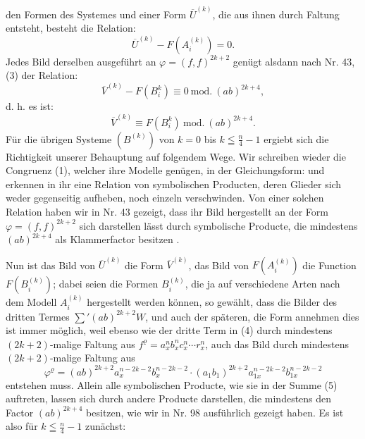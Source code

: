 den Formen des Systemes und einer Form $\overline{U}^{(k)}$, die aus ihnen durch
Faltung entsteht, besteht die Relation:
\[
\overline{U}^{(k)} - F(A_i^{(k)}) = 0.
\]
Jedes Bild derselben ausgeführt an $\varphi = (f,f)^{2k+2}$ genügt alsdann
nach Nr. 43, (3) der Relation:
\[
\overline{V}^{(k)} - F(B_i^{k}) \equiv 0 \ \mathrm{mod.}\ (ab)^{2k+4},
\]
d. h. es ist:
\[
\overline{V}^{(k)} \equiv F(B_i^{k}) \ \mathrm{mod.}\ (ab)^{2k+4}.
\]
Für die übrigen Systeme $(B^{(k)})$ von $k = 0$ bis $k \leqq \frac{n}{4} - 1$ ergiebt
 sich die Richtigkeit unserer Behauptung auf folgendem Wege.
Wir schreiben wieder die Congruenz (1), welcher ihre Modelle genügen,
in der Gleichungsform:
und erkennen in ihr eine Relation von symbolischen Producten, deren
Glieder sich weder gegenseitig aufheben, noch einzeln verschwinden.
Von einer solchen Relation haben wir in Nr. 43 gezeigt, dass ihr
Bild hergestellt an der Form $\varphi = (f,f)^{2k+2}$ sich darstellen lässt durch
symbolische Producte, die mindestens $(ab)^{2k+4}$ als Klammerfactor besitzen
.

Nun ist das Bild von $\overline{U}^{(k)}$ die Form $\overline{V}^{(k)}$, das Bild von $F(A_i^{(k)})$
die Function $F(B_i^{(k)})$; dabei seien die Formen $B_i^{(k)}$, die ja auf verschiedene
 Arten nach dem Modell $A_i^{(k)}$ hergestellt werden können, so
gewählt, dass die Bilder des dritten Termes $\sum{}'(ab)^{2k+2} W$, und auch
der späteren, die Form annehmen
dies ist immer möglich, weil ebenso wie der dritte Term in (4) durch
mindestens $(2k+2)$-malige Faltung aus $f^\varrho = a_x^n b_x^n c_x^n \cdots r_x^n$, auch das
Bild durch mindestens $(2k+2)$-malige Faltung aus
\[
\varphi^\varrho = (ab)^{2k+2} a_x^{n-2k-2} b_x^{n-2k-2} \cdot (a_1 b_1)^{2k+2} a_{1x}^{n-2k-2} b_{1x}^{n-2k-2}
\]
entstehen muss. Allein alle symbolischen Producte, wie sie in der
Summe (5) auftreten, lassen sich durch andere Producte darstellen,
die mindestens den Factor $(ab)^{2k+4}$ besitzen, wie wir in Nr. 98 ausführlich
 gezeigt haben. Es ist also für $k \leqq \frac{n}{4} - 1$ zunächst:


